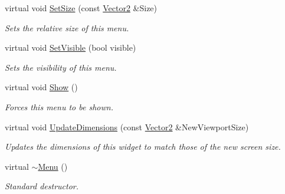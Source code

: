 \begin{DoxyCompactItemize}
virtual void \hyperlink{classphys_1_1UI_1_1Menu_adef3f9d3351c959f711e929a5e1c8f76}{SetSize} (const \hyperlink{classphys_1_1Vector2}{Vector2} \&Size)
\begin{DoxyCompactList}\small\item\em Sets the relative size of this menu. \item\end{DoxyCompactList}\item 
virtual void \hyperlink{classphys_1_1UI_1_1Menu_a4847e0de055a9c2f708f98742fa59a87}{SetVisible} (bool visible)
\begin{DoxyCompactList}\small\item\em Sets the visibility of this menu. \item\end{DoxyCompactList}\item 
\hypertarget{classphys_1_1UI_1_1Menu_aeb6373cc1be7da0bf5966129f271c861}{
virtual void \hyperlink{classphys_1_1UI_1_1Menu_aeb6373cc1be7da0bf5966129f271c861}{Show} ()}
\label{classphys_1_1UI_1_1Menu_aeb6373cc1be7da0bf5966129f271c861}

\begin{DoxyCompactList}\small\item\em Forces this menu to be shown. \item\end{DoxyCompactList}\item 
virtual void \hyperlink{classphys_1_1UI_1_1Menu_a60a678cc2be8f3eebfe65b3628557928}{UpdateDimensions} (const \hyperlink{classphys_1_1Vector2}{Vector2} \&NewViewportSize)
\begin{DoxyCompactList}\small\item\em Updates the dimensions of this widget to match those of the new screen size. \item\end{DoxyCompactList}\item 
\hypertarget{classphys_1_1UI_1_1Menu_a54b60c45238a3655da9dfa83104adb18}{
virtual \hyperlink{classphys_1_1UI_1_1Menu_a54b60c45238a3655da9dfa83104adb18}{$\sim$Menu} ()}
\label{classphys_1_1UI_1_1Menu_a54b60c45238a3655da9dfa83104adb18}

\begin{DoxyCompactList}\small\item\em Standard destructor. \item\end{DoxyCompactList}\end{DoxyCompactItemize}
